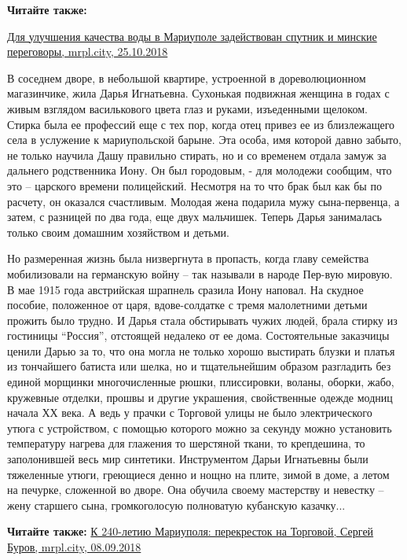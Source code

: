 \textbf{Читайте также:} 

\href{https://mrpl.city/news/view/dlya-uluchsheniya-kachestva-vody-v-mariupole-zadejstvovan-sputnik-i-minskie-peregovory}{%
Для улучшения качества воды в Мариуполе задействован спутник и минские переговоры, mrpl.city, 25.10.2018}

В соседнем дворе, в небольшой квартире, устроенной в дореволюционном
магазинчике, жила Дарья Игнатьевна. Сухонькая подвижная женщина в годах с живым
взглядом василькового цвета глаз и руками, изъеденными щелоком. Стирка была ее
профессий еще с тех пор, когда отец привез ее из близлежащего села в услужение
к мариупольской барыне. Эта особа, имя которой давно забыто, не только научила
Дашу правильно стирать, но и со временем отдала замуж за дальнего родственника
Иону. Он был городовым, - для молодежи сообщим, что это – царского времени
полицейский. Несмотря на то что брак был как бы по расчету, он оказался
счастливым. Молодая жена подарила мужу сына-первенца, а затем, с разницей по
два года, еще двух мальчишек. Теперь Дарья занималась только своим домашним
хозяйством и детьми.

Но размеренная жизнь была низвергнута в пропасть, когда главу семейства
мобилизовали на германскую войну – так называли в народе Пер\hyp{}вую мировую. В мае
1915 года австрийская шрапнель сразила Иону наповал. На скудное пособие,
положенное от царя, вдове-солдатке с тремя малолетними детьми прожить было
трудно. И Дарья стала обстирывать чужих людей, брала стирку из гостиницы
\enquote{Россия}, отстоящей недалеко от ее дома. Состоятельные заказчицы ценили Дарью
за то, что она могла не только хорошо выстирать блузки и платья из тончайшего
батиста или шелка, но и тщательнейшим образом разгладить без единой морщинки
многочисленные рюшки, плиссировки, воланы, оборки, жабо, кружевные отделки,
прошвы и другие украшения, свойственные одежде модниц начала ХХ века. А ведь у
прачки с Торговой улицы не было электрического утюга с устройством, с помощью
которого можно за секунду можно установить температуру нагрева для глажения то
шерстяной ткани, то крепдешина, то заполонившей весь мир синтетики.
Инструментом Дарьи Игнатьевны были тяжеленные утюги, греющиеся денно и нощно на
плите, зимой в доме, а летом на печурке, сложенной во дворе. Она обучила своему
мастерству и невестку – жену старшего сына, громкоголосую полноватую кубанскую
казачку...

\textbf{Читайте также:} \href{https://archive.org/details/08_09_2018.sergij_burov.mrpl_city.k_240_letiu_mariupolja_perekrestok_na_torgovoj}{К 240-летию Мариуполя: перекресток на Торговой, Сергей Буров, mrpl.city, 08.09.2018}

